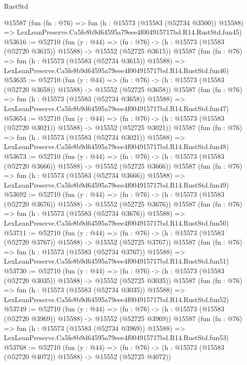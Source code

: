 \begin{lexlean}{RustStd}
\begin{coremodule}
    @15587
    (fun (fn : @76) =>
    fun (h : @15573 (@15583 (@52734 @3500)) @15588) =>
    LexLeanPreserve.Ca5fe8b9d64595a79eee4f004915717bd.R14.RustStd.fun45)
@53616 := @52710
    (fun (y : @44) =>
    (fn : @76) -> (h : @15573 (@15583 (@52720 @3615)) @15588) -> @15552 (@52725 @3615))
    @15587
    (fun (fn : @76) =>
    fun (h : @15573 (@15583 (@52734 @3615)) @15588) =>
    LexLeanPreserve.Ca5fe8b9d64595a79eee4f004915717bd.R14.RustStd.fun46)
@53635 := @52710
    (fun (y : @44) =>
    (fn : @76) -> (h : @15573 (@15583 (@52720 @3658)) @15588) -> @15552 (@52725 @3658))
    @15587
    (fun (fn : @76) =>
    fun (h : @15573 (@15583 (@52734 @3658)) @15588) =>
    LexLeanPreserve.Ca5fe8b9d64595a79eee4f004915717bd.R14.RustStd.fun47)
@53654 := @52710
    (fun (y : @44) =>
    (fn : @76) -> (h : @15573 (@15583 (@52720 @3021)) @15588) -> @15552 (@52725 @3021))
    @15587
    (fun (fn : @76) =>
    fun (h : @15573 (@15583 (@52734 @3021)) @15588) =>
    LexLeanPreserve.Ca5fe8b9d64595a79eee4f004915717bd.R14.RustStd.fun48)
@53673 := @52710
    (fun (y : @44) =>
    (fn : @76) -> (h : @15573 (@15583 (@52720 @3666)) @15588) -> @15552 (@52725 @3666))
    @15587
    (fun (fn : @76) =>
    fun (h : @15573 (@15583 (@52734 @3666)) @15588) =>
    LexLeanPreserve.Ca5fe8b9d64595a79eee4f004915717bd.R14.RustStd.fun49)
@53692 := @52710
    (fun (y : @44) =>
    (fn : @76) -> (h : @15573 (@15583 (@52720 @3676)) @15588) -> @15552 (@52725 @3676))
    @15587
    (fun (fn : @76) =>
    fun (h : @15573 (@15583 (@52734 @3676)) @15588) =>
    LexLeanPreserve.Ca5fe8b9d64595a79eee4f004915717bd.R14.RustStd.fun50)
@53711 := @52710
    (fun (y : @44) =>
    (fn : @76) -> (h : @15573 (@15583 (@52720 @3767)) @15588) -> @15552 (@52725 @3767))
    @15587
    (fun (fn : @76) =>
    fun (h : @15573 (@15583 (@52734 @3767)) @15588) =>
    LexLeanPreserve.Ca5fe8b9d64595a79eee4f004915717bd.R14.RustStd.fun51)
@53730 := @52710
    (fun (y : @44) =>
    (fn : @76) -> (h : @15573 (@15583 (@52720 @3035)) @15588) -> @15552 (@52725 @3035))
    @15587
    (fun (fn : @76) =>
    fun (h : @15573 (@15583 (@52734 @3035)) @15588) =>
    LexLeanPreserve.Ca5fe8b9d64595a79eee4f004915717bd.R14.RustStd.fun52)
@53749 := @52710
    (fun (y : @44) =>
    (fn : @76) -> (h : @15573 (@15583 (@52720 @3969)) @15588) -> @15552 (@52725 @3969))
    @15587
    (fun (fn : @76) =>
    fun (h : @15573 (@15583 (@52734 @3969)) @15588) =>
    LexLeanPreserve.Ca5fe8b9d64595a79eee4f004915717bd.R14.RustStd.fun53)
@53768 := @52710
    (fun (y : @44) =>
    (fn : @76) -> (h : @15573 (@15583 (@52720 @4072)) @15588) -> @15552 (@52725 @4072))

\end{coremodule}
\end{lexlean}
